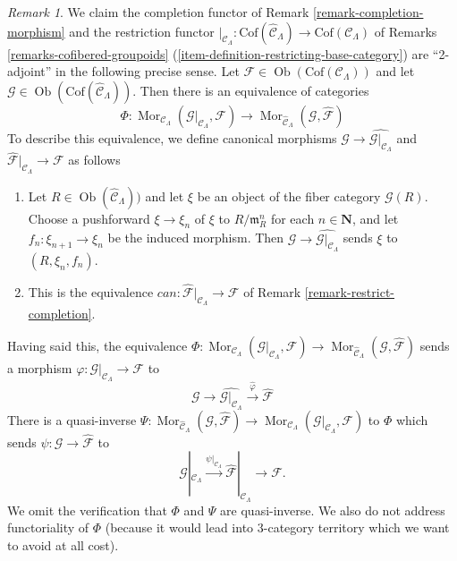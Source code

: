 \documentclass{stacks-project}
\theoremstyle{plain}
\theoremstyle{definition}
\theoremstyle{remark}
\newtheorem{remark}[subsection]{Remark}
\numberwithin{equation}{subsection}
\def\Mor{\mathop{\mathrm{Mor}}\nolimits}
\def\Ob{\mathop{\mathrm{Ob}}\nolimits}
\begin{document}
\begin{remark}
\label{remark-completion-restriction-adjoint}
We claim the completion functor of
Remark \ref{remark-completion-morphism}
and the restriction functor
$|_{\mathcal{C}_\Lambda} : \text{Cof}(\widehat{\mathcal{C}}_\Lambda)
\to \text{Cof}(\mathcal{C}_\Lambda)$ of
Remarks \ref{remarks-cofibered-groupoids}
(\ref{item-definition-restricting-base-category})
are ``2-adjoint'' in the following precise sense. Let
$\mathcal{F} \in \Ob(\text{Cof}(\mathcal{C}_\Lambda))$
and let
$\mathcal{G} \in \Ob(\text{Cof}(\widehat{\mathcal{C}}_\Lambda))$.
Then there is an equivalence of categories
$$
\Phi :
\Mor_{\mathcal{C}_\Lambda}(
\mathcal{G}|_{\mathcal{C}_\Lambda}, \mathcal{F})
\longrightarrow
\Mor_{\widehat{\mathcal{C}}_\Lambda}(\mathcal{G}, \widehat{\mathcal{F}})
$$
To describe this equivalence, we
define canonical morphisms
$\mathcal{G} \to \widehat{\mathcal{G}|_{\mathcal{C}_\Lambda}}$ and
$\widehat{\mathcal{F}}|_{\mathcal{C}_\Lambda} \to \mathcal{F}$ as follows
\begin{enumerate}
\item Let $R \in \Ob(\widehat{\mathcal{C}}_\Lambda))$ and let $\xi$
be an object of the fiber category $\mathcal{G}(R)$.
Choose a pushforward $\xi \to \xi_n$ of $\xi$ to
$R/\mathfrak m_R^n$ for each $n \in \mathbf{N}$, and let
$f_n : \xi_{n + 1} \to \xi_n$ be the induced morphism.
Then $\mathcal{G} \to \widehat{\mathcal{G}|_{\mathcal{C}_\Lambda}}$
sends $\xi$ to $(R, \xi_n, f_n)$.
\item This is the equivalence
$can : \widehat{\mathcal{F}}|_{\mathcal{C}_\Lambda} \to \mathcal{F}$
of
Remark \ref{remark-restrict-completion}.
\end{enumerate}
Having said this, the equivalence
$\Phi : \Mor_{\mathcal{C}_\Lambda}(
\mathcal{G}|_{\mathcal{C}_\Lambda}, \mathcal{F})  \to
\Mor_{\widehat{\mathcal{C}}_\Lambda}(\mathcal{G},
\widehat{\mathcal{F}})$
sends a morphism
$\varphi : \mathcal{G}|_{\mathcal{C}_\Lambda} \to \mathcal{F}$
to
$$
\mathcal{G} \to \widehat{\mathcal{G}|_{\mathcal{C}_\Lambda}}
\xrightarrow{\widehat{\varphi}} \widehat{\mathcal{F}}
$$
There is a quasi-inverse
$\Psi :
\Mor_{\widehat{\mathcal{C}}_\Lambda}(
\mathcal{G}, \widehat{\mathcal{F}}) \to
\Mor_{\mathcal{C}_\Lambda}(
\mathcal{G}|_{\mathcal{C}_\Lambda}, \mathcal{F})$
to $\Phi$ which sends $\psi : \mathcal{G} \to \widehat{\mathcal{F}}$ to
$$
\mathcal{G}|_{\mathcal{C}_\Lambda} \xrightarrow{\psi|_{\mathcal{C}_\Lambda}}
\widehat{\mathcal{F}}|_{\mathcal{C}_\Lambda} \to \mathcal{F}.
$$
We omit the verification that $\Phi$ and $\Psi$ are quasi-inverse.
We also do not address functoriality of $\Phi$ (because it would
lead into 3-category territory which we want to avoid at all cost).
\end{remark}
\end{document}
